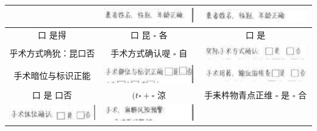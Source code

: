 \documentclass[10pt]{article}
\begin{document}
\begin{center}
\begin{tabular}{|c|c|c|}
 & \includegraphics[max width=\textwidth]{2024_07_05_645bb794a4d4f32ee0c8g-080(23)}
 & \includegraphics[max width=\textwidth]{2024_07_05_645bb794a4d4f32ee0c8g-080(32)}
 \\
\hline
$口$ 是㧹 & $口$ 昆 $\square$ 各 & $口$ 是 \\
\hline
乎术方式唃狁：昆口否 & 手术方式确认㖷 $\square$ 自 & \includegraphics[max width=\textwidth]{2024_07_05_645bb794a4d4f32ee0c8g-080(31)}
 \\
\hline
手术暗位与标识正能 & \includegraphics[max width=\textwidth]{2024_07_05_645bb794a4d4f32ee0c8g-080(22)}
 & \includegraphics[max width=\textwidth]{2024_07_05_645bb794a4d4f32ee0c8g-080(4)}
 \\
\hline
$口$ 是 口否 & $(t \square+\square$ 涼 & 手耒㭌物青点正维 $\square$ 是 $\square$ 合 \\
\hline
\includegraphics[max width=\textwidth]{2024_07_05_645bb794a4d4f32ee0c8g-080(6)}
 & \includegraphics[max width=\textwidth]{2024_07_05_645bb794a4d4f32ee0c8g-080(5)}

\end{tabular}
\end{center}
\end{document}

